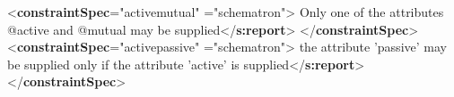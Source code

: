 \begin{shaded}
{<\textbf{constraintSpec}\hspace*{1em}{ident}="{activemutual}"\mbox{}\newline 
\hspace*{1em}{scheme}="{schematron}">}\mbox{}\newline 
{}\mbox{}\newline 
\hspace*{1em}Only one of the\mbox{}\newline 
\hspace*{1em}\hspace*{1em}\hspace*{1em}\hspace*{1em} attributes @active and @mutual may be supplied{</\textbf{s:report}>}\mbox{}\newline 
{}\mbox{}\newline 
{</\textbf{constraintSpec}>}\mbox{}\newline 
{<\textbf{constraintSpec}\hspace*{1em}{ident}="{activepassive}"\mbox{}\newline 
\hspace*{1em}{scheme}="{schematron}">}\mbox{}\newline 
{}\mbox{}\newline 
\hspace*{1em}the\mbox{}\newline 
\hspace*{1em}\hspace*{1em}\hspace*{1em}\hspace*{1em} attribute 'passive' may be supplied only if the attribute 'active' is supplied{</\textbf{s:report}>}\mbox{}\newline 
{}\mbox{}\newline 
{</\textbf{constraintSpec}>}\end{shaded}\egroup\par \par

